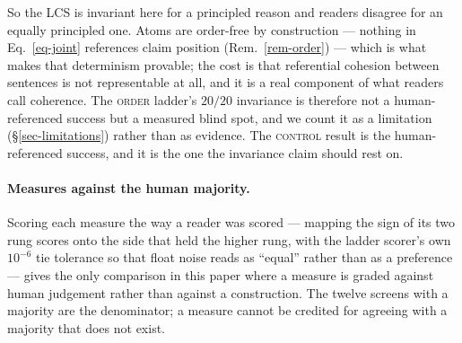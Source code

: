 So the LCS is invariant here for a principled reason and readers disagree for an equally principled
one. Atoms are order-free by construction --- nothing in Eq.~\ref{eq-joint} references claim position
(Rem.~\ref{rem-order}) --- which is what makes that determinism provable; the cost is that referential cohesion between sentences
is not representable at all, and it is a real component of what readers call coherence. The
\textsc{order} ladder's $20/20$ invariance is therefore not a human-referenced success but a measured
blind spot, and we count it as a limitation (\S\ref{sec-limitations}) rather than as evidence. The
\textsc{control} result is the human-referenced success, and it is the one the invariance claim should
rest on.

\paragraph{Measures against the human majority.} Scoring each measure the way a reader was scored ---
mapping the sign of its two rung scores onto the side that held the higher rung, with the ladder
scorer's own $10^{-6}$ tie tolerance so that float noise reads as ``equal'' rather than as a
preference --- gives the only comparison in this paper where a measure is graded against human
judgement rather than against a construction. The twelve screens with a majority are the denominator;
a measure cannot be credited for agreeing with a majority that does not exist.

